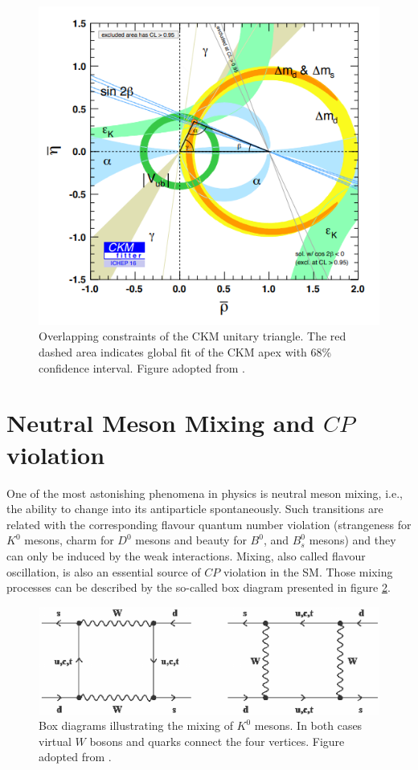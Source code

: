 \begin{figure}
\centering
\includegraphics[scale=0.7]{figures/Unitary_triangle_constrains.PNG}
\caption{Overlapping constraints of the CKM unitary triangle. The red dashed area indicates global fit of the CKM apex with 68\% confidence interval. Figure adopted from \cite{CKMFitter}.
\label{fig:triangle}}
\end{figure}


\section{Neutral Meson Mixing and $CP$ violation}

One of the most astonishing phenomena in physics is neutral meson mixing, i.e., the ability to change into its antiparticle spontaneously. Such transitions are related with the corresponding flavour quantum number violation (strangeness for $K^0$ mesons, charm for $D^0$ mesons and beauty for $B^0$, and $B^0_ s$ mesons) and they can only be induced by the weak interactions. Mixing, also called flavour oscillation, is also an essential source of $CP$ violation in the SM. Those mixing processes can be described by the so-called box diagram presented in figure \ref{fig:Mixinig}. 


\begin{figure}
\centering
\includegraphics[scale=0.9]{figures/Box-diagrams-depicting-K-0-K-0-mixing.png}
\caption{Box diagrams illustrating the mixing of $K^{0}$ mesons. In both cases virtual $W$ bosons
and quarks connect the four vertices. Figure adopted from \cite{Mixing}.
\label{fig:Mixinig}}
\end{figure}


